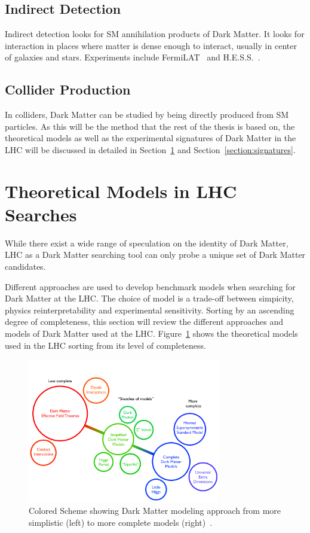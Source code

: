 \subsection{Indirect Detection}
Indirect detection looks for SM annihilation products of Dark Matter. It looks for interaction in places where matter is dense enough to interact, usually in center of galaxies and stars. Experiments include FermiLAT~\cite{albert2017searching} and H.E.S.S.~\cite{aharonian2006hess}.

\subsection{Collider Production} 
In colliders, Dark Matter can be studied by being directly produced from SM particles. As this will be the method that the rest of the thesis is based on, 
the theoretical models as well as the experimental signatures of Dark Matter in the LHC will be discussed in detailed in Section~\ref{section:models} and Section~\ref{section:signatures}.

\section{Theoretical Models in LHC Searches}
\label{section:models}
While there exist a wide range of speculation on the identity of Dark Matter, LHC as a Dark Matter searching tool can only probe a unique set of Dark Matter candidates.

Different approaches are used to develop benchmark models when searching for Dark Matter at the LHC. The choice of model is a trade-off between simpicity, physics reinterpretability and experimental sensitivity. Sorting by an ascending degree of completeness, this section will review the different approaches and models of Dark Matter used at the LHC. Figure~\ref{fig:Model_figure} shows the theoretical models used in the LHC sorting from its level of completeness.

\begin{figure}[!htb]
    \begin{center}
        \includegraphics[width=0.75\textwidth]{figures/chapter_DM/Model}
        \caption{
			Colored Scheme showing Dark Matter modeling approach from more simplistic (left) to more complete models (right)~\cite{Abdallah:2024101}.
        }
        \label{fig:Model_figure}
    \end{center}
\end{figure}

